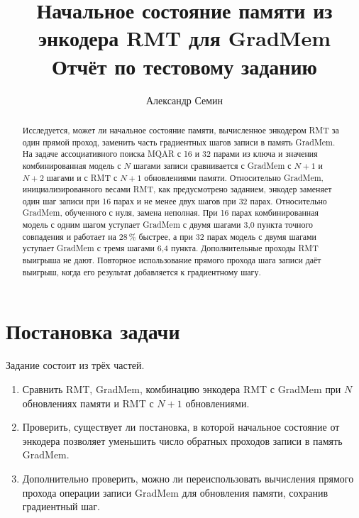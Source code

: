 \documentclass[a4paper,11pt]{article}
\title{Начальное состояние памяти из энкодера RMT для GradMem\\[2pt]\large Отчёт по тестовому заданию}
\author{Александр Семин}
\date{}
\begin{document}
\maketitle
\vspace{-1.2em}

\begin{abstract}
Исследуется, может ли начальное состояние памяти, вычисленное энкодером RMT за один прямой проход, заменить часть градиентных шагов записи в память GradMem. На задаче ассоциативного поиска MQAR с 16 и 32 парами из ключа и значения комбинированная модель с $N$ шагами записи сравнивается с GradMem с $N+1$ и $N+2$ шагами и с RMT с $N+1$ обновлениями памяти. Относительно GradMem, инициализированного весами RMT, как предусмотрено заданием, энкодер заменяет один шаг записи при 16 парах и не менее двух шагов при 32 парах. Относительно GradMem, обученного с нуля, замена неполная. При 16 парах комбинированная модель с одним шагом уступает GradMem с двумя шагами 3,0 пункта точного совпадения и работает на 28\,\% быстрее, а при 32 парах модель с двумя шагами уступает GradMem с тремя шагами 6,4 пункта. Дополнительные проходы RMT выигрыша не дают. Повторное использование прямого прохода шага записи даёт выигрыш, когда его результат добавляется к градиентному шагу.
\end{abstract}

\section{Постановка задачи}
Задание состоит из трёх частей.
\begin{enumerate}\setlength{\itemsep}{0pt}
\item Сравнить RMT, GradMem, комбинацию энкодера RMT с GradMem при $N$ обновлениях памяти и RMT с $N+1$ обновлениями.
\item Проверить, существует ли постановка, в которой начальное состояние от энкодера позволяет уменьшить число обратных проходов записи в память GradMem.
\item Дополнительно проверить, можно ли переиспользовать вычисления прямого прохода операции записи GradMem для обновления памяти, сохранив градиентный шаг.
\end{enumerate}
\end{document}
